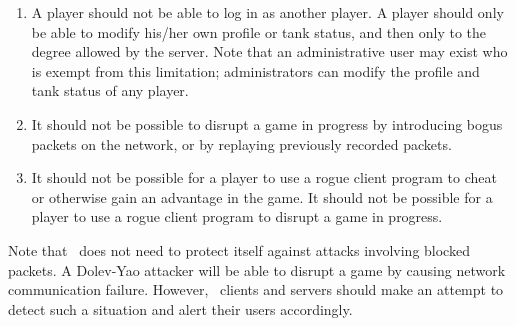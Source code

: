 \begin{enumerate}
\item A player should not be able to log in as another player. A player should only be able to modify his/her own profile or tank status, and then only to the degree allowed by the server. Note that an administrative user may exist who is exempt from this limitation; administrators can modify the profile and tank status of any player.

\item It should not be possible to disrupt a game in progress by introducing bogus packets on the network, or by replaying previously recorded packets.

\item It should not be possible for a player to use a rogue client program to cheat or otherwise gain an advantage in the game. It should not be possible for a player to use a rogue client program to disrupt a game in progress.
\end{enumerate}

Note that \VTank\ does not need to protect itself against attacks involving blocked packets. A Dolev-Yao attacker will be able to disrupt a game by causing network communication failure. However, \VTank\ clients and servers should make an attempt to detect such a situation and alert their users accordingly.

